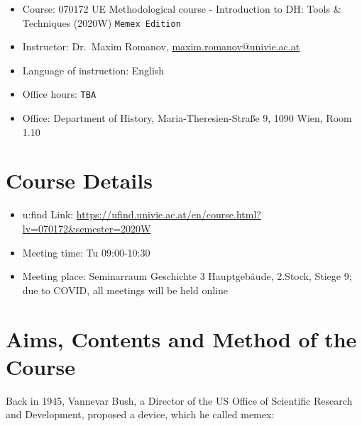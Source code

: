 \documentclass[
]{book}
\providecommand{\tightlist}{%
  \setlength{\itemsep}{0pt}\setlength{\parskip}{0pt}}
\begin{document}
\begin{itemize}
\tightlist
\item
  Course: 070172 UE Methodological course - Introduction to DH: Tools \& Techniques (2020W) \texttt{Memex\ Edition}
\item
  Instructor: Dr.~Maxim Romanov, \url{maxim.romanov@univie.ac.at}
\item
  Language of instruction: English
\item
  Office hours: \texttt{TBA}
\item
  Office: Department of History, Maria-Theresien-Straße 9, 1090 Wien, Room 1.10
\end{itemize}

\hypertarget{course-details}{%
\section*{Course Details}\label{course-details}}

\begin{itemize}
\tightlist
\item
  u:find Link: \url{https://ufind.univie.ac.at/en/course.html?lv=070172\&semester=2020W}
\item
  Meeting time: Tu 09:00-10:30
\item
  Meeting place: Seminarraum Geschichte 3 Hauptgebäude, 2.Stock, Stiege 9; due to COVID, all meetings will be held online
\end{itemize}

\hypertarget{aims-contents-and-method-of-the-course}{%
\section*{Aims, Contents and Method of the Course}\label{aims-contents-and-method-of-the-course}}

Back in 1945, Vannevar Bush, a Director of the US Office of Scientific Research and Development, proposed a device, which he called memex:
\end{document}
